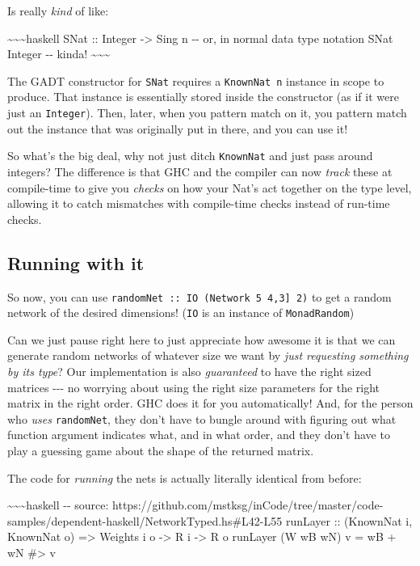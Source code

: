 \documentclass[]{article}
\begin{document}
Is really \emph{kind} of like:

\textasciitilde{}\textasciitilde{}\textasciitilde{}haskell SNat :: Integer
-\textgreater{} Sing n -\/- or, in normal data type notation SNat Integer -\/-
kinda! \textasciitilde{}\textasciitilde{}\textasciitilde{}

The GADT constructor for \texttt{SNat} requires a \texttt{KnownNat\ n} instance
in scope to produce. That instance is essentially stored inside the constructor
(as if it were just an \texttt{Integer}). Then, later, when you pattern match on
it, you pattern match out the instance that was originally put in there, and you
can use it!

So what's the big deal, why not just ditch \texttt{KnownNat} and just pass
around integers? The difference is that GHC and the compiler can now
\emph{track} these at compile-time to give you \emph{checks} on how your Nat's
act together on the type level, allowing it to catch mismatches with
compile-time checks instead of run-time checks.

\subsection{Running with it}

So now, you can use
\texttt{randomNet\ ::\ IO\ (Network\ 5\ \textquotesingle{}{[}4,3{]}\ 2)} to get
a random network of the desired dimensions! (\texttt{IO} is an instance of
\texttt{MonadRandom})

Can we just pause right here to just appreciate how awesome it is that we can
generate random networks of whatever size we want by \emph{just requesting
something by its type}? Our implementation is also \emph{guaranteed} to have the
right sized matrices -\/-\/- no worrying about using the right size parameters
for the right matrix in the right order. GHC does it for you automatically! And,
for the person who \emph{uses} \texttt{randomNet}, they don't have to bungle
around with figuring out what function argument indicates what, and in what
order, and they don't have to play a guessing game about the shape of the
returned matrix.

The code for \emph{running} the nets is actually literally identical from
before:

\textasciitilde{}\textasciitilde{}\textasciitilde{}haskell -\/- source:
https://github.com/mstksg/inCode/tree/master/code-samples/dependent-haskell/NetworkTyped.hs\#L42-L55
runLayer :: (KnownNat i, KnownNat o) =\textgreater{} Weights i o -\textgreater{}
R i -\textgreater{} R o runLayer (W wB wN) v = wB + wN \#\textgreater{} v
\end{document}
